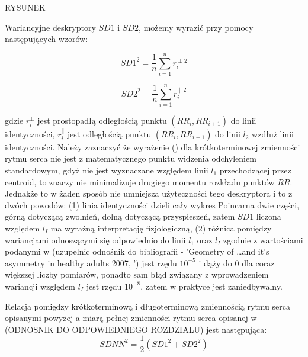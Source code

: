 RYSUNEK


Wariancyjne deskryptory $SD1$ i $SD2$, możemy wyrazić przy pomocy następujących wzorów: 

\begin{equation}
SD1^2 = \frac{1}{n}\sum_{i=1}^{n}r_{i}^{\perp 2}
\end{equation}

\begin{equation}
SD2^2 = \frac{1}{n}\sum_{i=1}^{n}r_{i}^{\parallel 2}
\end{equation}

gdzie $r_{i}^{\perp}$ jest prostopadłą odległością punktu $(RR_{i}, RR_{i+1})$ do linii
identyczności, $r_{i}^{\parallel}$ jest odległością punktu $(RR_{i}, RR_{i+1})$ do linii
$l_2$ wzdłuż linii identyczności.
Należy zaznaczyć że wyrażenie () dla krótkoterminowej zmienności rytmu serca
nie jest z matematycznego punktu widzenia odchyleniem standardowym, gdyż nie jest
wyznaczane względem linii $l_1$ przechodzącej przez centroid, to znaczy nie minimalizuje
drugiego momentu rozkładu punktów $RR$. Jednakże to w żaden sposób
nie umniejsza użyteczności tego deskryptora i to z dwóch powodów: (1) linia
identyczności dzieli cały wykres Poincar\ee na dwie części, górną dotyczącą zwolnień,
dolną dotyczącą przyspieszeń, zatem $SD1$ liczona względem $l_{I}$ ma wyraźną interpretację
fizjologiczną, (2) różnica pomiędzy wariancjami odnoszącymi się odpowiednio do linii $l_1$
oraz $l_{I}$ zgodnie z wartościami podanymi w 
(uzupelnic odnośnik do bibliografii - 'Geometry of \ldots  and it's asymmetry in healthy adults 2007, ')
jest rzędu $10^{-5}$ i dąży do $0$ dla coraz większej liczby pomiarów, ponadto sam błąd
związany z wprowadzeniem wariancji względem $l_{I}$ jest rzędu $10^{-8}$, zatem w praktyce
jest zaniedbywalny.

Relacja pomiędzy krótkoterminową i długoterminową zmiennością rytmu serca opisanymi powyżej
a miarą pełnej zmienności rytmu serca opisanej w (ODNOSNIK DO ODPOWIEDNIEGO ROZDZIALU)
jest następująca:
\begin{equation}
SDNN^2 = \frac{1}{2}(SD1^2 + SD2^2)
\end{equation}